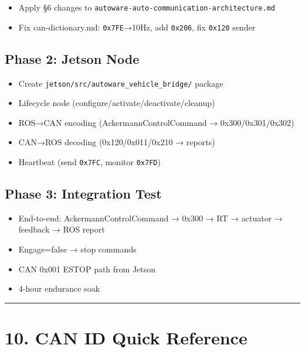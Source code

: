\documentclass[12pt,a4paper,oneside]{report}
\providecommand{\tightlist}{\setlength{\itemsep}{0pt}\setlength{\parskip}{0pt}}
\begin{document}
\begin{itemize}
\tightlist
\item[$\square$]
  Apply §6 changes to \texttt{autoware-auto-communication-architecture.md}
\item[$\square$]
  Fix can-dictionary.md: \texttt{0x7FE}→10Hz, add \texttt{0x206}, fix
  \texttt{0x120} sender
\end{itemize}

\subsection{Phase 2: Jetson Node}\label{phase-2-jetson-node}

\begin{itemize}
\tightlist
\item[$\square$]
  Create \texttt{jetson/src/autoware\_vehicle\_bridge/} package
\item[$\square$]
  Lifecycle node (configure/activate/deactivate/cleanup)
\item[$\square$]
  ROS→CAN encoding (AckermannControlCommand → 0x300/0x301/0x302)
\item[$\square$]
  CAN→ROS decoding (0x120/0x011/0x210 → reports)
\item[$\square$]
  Heartbeat (send \texttt{0x7FC}, monitor \texttt{0x7FD})
\end{itemize}

\subsection{Phase 3: Integration Test}\label{phase-3-integration-test}

\begin{itemize}
\tightlist
\item[$\square$]
  End-to-end: AckermannControlCommand → 0x300 → RT → actuator → feedback → ROS
  report
\item[$\square$]
  Engage=false → stop commands
\item[$\square$]
  CAN 0x001 ESTOP path from Jetson
\item[$\square$]
  4-hour endurance soak
\end{itemize}

\begin{center}\rule{0.5\linewidth}{0.5pt}\end{center}

\section{10. CAN ID Quick Reference}\label{can-id-quick-reference}
\end{document}
